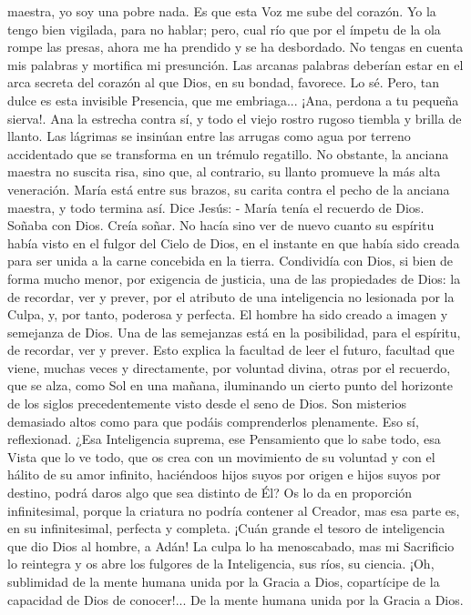 \documentclass[12pt]{book} %
\begin{document}
maestra, yo soy una pobre nada. Es que esta Voz me sube del corazón. Yo la tengo bien vigilada, para no hablar; pero, cual río que por el ímpetu de la ola rompe las presas, ahora me ha prendido y se ha desbordado. No tengas en cuenta mis palabras y mortifica mi presunción. Las arcanas palabras deberían estar en el arca secreta del corazón al que Dios, en su bondad, favorece. Lo sé. Pero, tan dulce es esta invisible Presencia, que me embriaga... ¡Ana, perdona a tu pequeña sierva!. 
Ana la estrecha contra sí, y todo el viejo rostro rugoso tiembla y brilla de llanto. Las lágrimas se insinúan entre las arrugas como agua por terreno accidentado que se transforma en un trémulo regatillo. No obstante, la anciana maestra no suscita risa, sino que, al contrario, su llanto promueve la más alta veneración. 
María está entre sus brazos, su carita contra el pecho de la anciana maestra, y todo termina así. 
Dice Jesús: 
- María tenía el recuerdo de Dios. Soñaba con Dios. Creía soñar. No hacía sino ver de nuevo cuanto su espíritu había 
visto en el fulgor del Cielo de Dios, en el instante en que había sido creada para ser unida a la carne concebida en la tierra. Condividía con Dios, si bien de forma mucho menor, por exigencia de justicia, una de las propiedades de Dios: la de recordar, ver y prever, por el atributo de una inteligencia no lesionada por la Culpa, y, por tanto, poderosa y perfecta. 
El hombre ha sido creado a imagen y semejanza de Dios. Una de las semejanzas está en la posibilidad, para el espíritu, de recordar, ver y prever. Esto explica la facultad de leer el futuro, facultad que viene, muchas veces y directamente, por voluntad divina, otras por el recuerdo, que se alza, como Sol en una mañana, iluminando un cierto punto del horizonte de los siglos precedentemente visto desde el seno de Dios. 
Son misterios demasiado altos como para que podáis comprenderlos plenamente. Eso sí, reflexionad. 
¿Esa Inteligencia suprema, ese Pensamiento que lo sabe todo, esa Vista que lo ve todo, que os crea con un movimiento 
de su voluntad y con el hálito de su amor infinito, haciéndoos hijos suyos por origen e hijos suyos por destino, podrá daros algo que sea distinto de Él? Os lo da en proporción infinitesimal, porque la criatura no podría contener al Creador, mas esa parte es, en su infinitesimal, perfecta y completa. 
¡Cuán grande el tesoro de inteligencia que dio Dios al hombre, a Adán! La culpa lo ha menoscabado, mas mi Sacrificio lo 
reintegra y os abre los fulgores de la Inteligencia, sus ríos, su ciencia. ¡Oh, sublimidad de la mente humana unida por la Gracia a Dios, copartícipe de la capacidad de Dios de conocer!... De la mente humana unida por la Gracia a Dios. 
\end{document}
